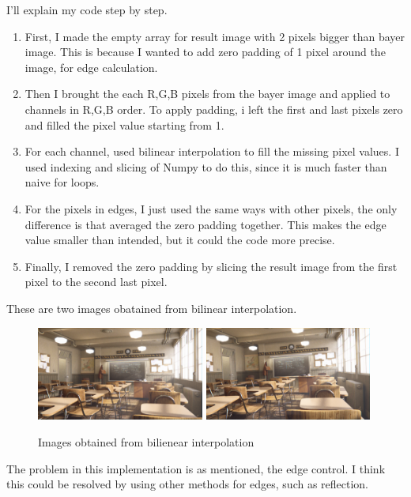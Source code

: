 I'll explain my code step by step. 


\begin{enumerate}
    \item First, I made the empty array for result image with 2 pixels bigger than bayer image. This is because I wanted to add zero padding of 1 pixel around the image, for edge calculation.
    \item Then I brought the each R,G,B pixels from the bayer image and applied to channels in R,G,B order. To apply padding, i left the first and last pixels zero and filled the pixel value starting from 1.
    \item For each channel, used bilinear interpolation to fill the missing pixel values. I used indexing and slicing of Numpy to do this, since it is much faster than naive for loops.
    \item For the pixels in edges, I just used the same ways with other pixels, the only difference is that averaged the zero padding together. This makes the edge value smaller than intended, but it could the code more precise.
    \item Finally, I removed the zero padding by slicing the result image from the first pixel to the second last pixel.
\end{enumerate}

These are two images obatained from bilinear interpolation.

\begin{figure}
    \centering
    \includegraphics[width=5.5cm]{../result/bilinear_img1.png}
    \includegraphics[width=5.5cm]{../result/bilinear_img2.png}
\caption{Images obtained from bilienear interpolation}
\end{figure}

The problem in this implementation is as mentioned, the edge control. I think this could be resolved by using other methods for edges, such as reflection.


